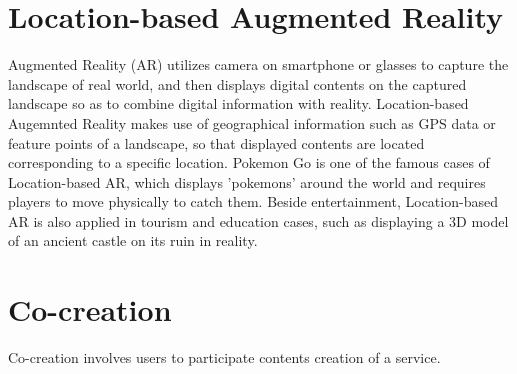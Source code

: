 \section{Location-based Augmented Reality}
Augmented Reality (AR) utilizes camera on smartphone or glasses to capture the landscape of real world,
and then displays digital contents on the captured landscape so as to combine digital information with reality.
Location-based Augemnted Reality makes use of geographical information such as GPS data or feature points of a landscape,
so that displayed contents are located corresponding to a specific location.
Pokemon Go is one of the famous cases of Location-based AR, which displays 'pokemons' around the world and requires players to move physically to catch them.
Beside entertainment, Location-based AR is also applied in tourism and education cases, such as displaying a 3D model of an ancient castle on its ruin in reality.

\section{Co-creation}
Co-creation involves users to participate contents creation of a service.
